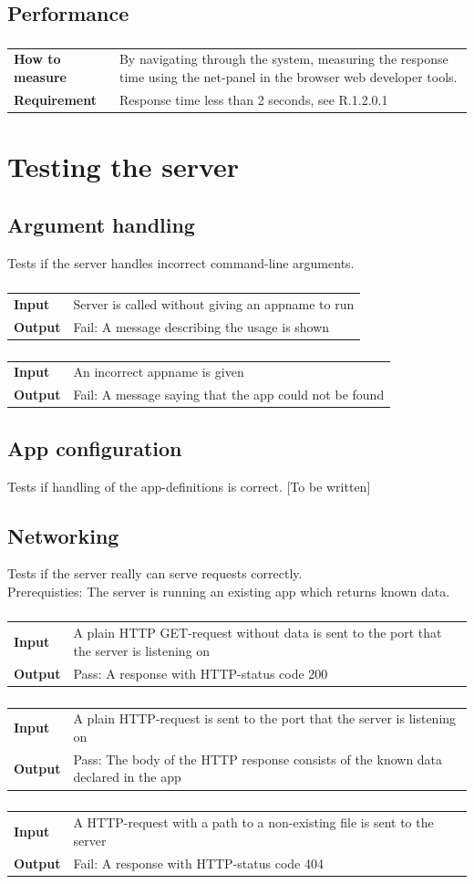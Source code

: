 \documentclass[a4paper, 12pt, titlepage]{article}
\newcommand{\urequirement}[2]{
	\subsubsection{}
	\begin{tabular}{l p{10cm}}
	\bf{How to measure} & 
		#1\\
	\bf{Requirement} & 
		#2\\
	\end{tabular}
}
\newcommand{\testcase}[2]{
	\subsubsection{}
	\begin{tabular}{l p{11cm}}
	\bf{Input} & 
		#1\\
	\bf{Output} & 
		#2\\
	\end{tabular}
}
\begin{document}
	\subsection{Performance}
		\urequirement
		{
			By navigating through the system, measuring the response time using the net-panel in the browser web developer tools.
		}{
			Response time less than 2 seconds, see R.1.2.0.1
		}

	\section{Testing the server}
	\subsection{Argument handling}
	Tests if the server handles incorrect command-line arguments.\\

		\testcase
		{
			Server is called without giving an appname to run
		}{
			Fail: A message describing the usage is shown
		}

		\testcase
		{
			An incorrect appname is given
		}{
			Fail: A message saying that the app could not be found
		}

	\subsection{App configuration}
	Tests if handling of the app-definitions is correct. [To be written]\\


	\subsection{Networking}
	Tests if the server really can serve requests correctly.\\
	Prerequisties: The server is running an existing app which returns known data.

		\testcase
		{
			A plain HTTP GET-request without data is sent to the port that the server is listening on
		}{
			Pass: A response with HTTP-status code 200
		}

		\testcase
		{
			A plain HTTP-request is sent to the port that the server is listening on
		}{
			Pass: The body of the HTTP response consists of the known data declared in the app
		}

		\testcase
		{
			A HTTP-request with a path to a non-existing file is sent to the server
		}{
			Fail:  A response with HTTP-status code 404
		}
\end{document}
